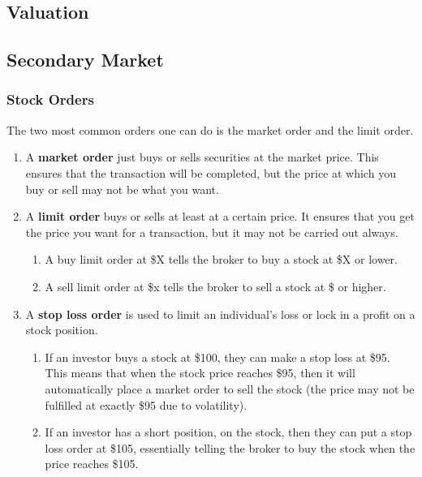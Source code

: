 \documentclass{article}
\begin{document}
  \subsection{Valuation}


  \subsection{Secondary Market}

    \subsubsection{Stock Orders}

      \begin{definition}
        The two most common orders one can do is the market order and the limit order. 
        \begin{enumerate}
          \item A \textbf{market order} just buys or sells securities at the market price. This ensures that the transaction will be completed, but the price at which you buy or sell may not be what you want. 
          \item A \textbf{limit order} buys or sells at least at a certain price. It ensures that you get the price you want for a transaction, but it may not be carried out always. 
          \begin{enumerate}
            \item A buy limit order at \$X tells the broker to buy a stock at \$X or lower. 
            \item A sell limit order at \$x tells the broker to sell a stock at \$ or higher. 
          \end{enumerate}
          \item A \textbf{stop loss order} is used to limit an individual's loss or lock in a profit on a stock position. 
          \begin{enumerate}
            \item If an investor buys a stock at \$100, they can make a stop loss at \$95. This means that when the stock price reaches \$95, then it will automatically place a market order to sell the stock (the price may not be fulfilled at exactly \$95 due to volatility). 
            \item If an investor has a short position, on the stock, then they can put a stop loss order at \$105, essentially telling the broker to buy the stock when the price reaches \$105. 
          \end{enumerate}
        \end{enumerate}
      \end{definition}
\end{document}
